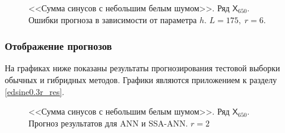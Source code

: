 \documentclass[specialist,
               substylefile = spbu.rtx,
               subf,href,colorlinks=true, 12p]{disser}
\begin{document}
\begin{figure}[H]
	\captionsetup{justification=centering}
	\caption{<<Сумма синусов с небольшим белым шумом>>. Ряд $\mathsf{X}_{650}$. Ошибки прогноза в зависимости от параметра $h$. $L = 175, \; r = 6$.}
	\label{edsin0.3r_r6.h}
\end{figure}

\subsubsection{Отображение прогнозов}
\label{aedsine0.3r_res}
На графиках ниже показаны результаты прогнозирования тестовой выборки обычных и гибридных методов. Графики являются приложением к разделу \ref{edsine0.3r_res}.

\begin{figure}[H]
	\captionsetup{justification=centering}
	\caption{<<Сумма синусов с небольшим белым шумом>>. Ряд $\mathsf{X}_{650}$. Прогноз результатов для ANN и SSA-ANN. $r = 2$}
\end{figure}
\end{document}
